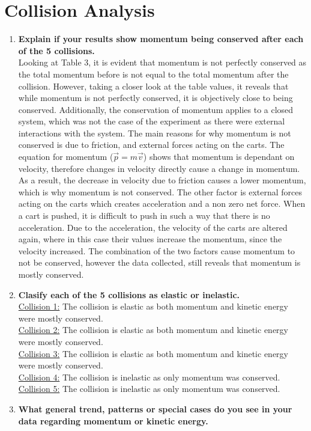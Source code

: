 \documentclass[12pt,letterpaper]{article}
\begin{document}
\section{Collision Analysis}
\begin{enumerate}
	\item \textbf{Explain if your results show momentum being conserved after each of the 5 collisions.}\\
	      Looking at Table 3, it is evident that momentum is not perfectly conserved as the total momentum before is not equal to the total momentum after the collision.
	      However, taking a closer look at the table values, it reveals that while momentum is not perfectly conserved, it is objectively close to being conserved.
	      Additionally, the conservation of momentum applies to a closed system, which was not the case of the experiment as there were external interactions with the system.
	      The main reasons for why momentum is not conserved is due to friction, and external forces acting on the carts.
	      The equation for momentum ($\vec{p} = m\vec{v}$) shows that momentum is dependant on velocity, therefore changes in velocity directly cause a change in momentum.
	      As a result, the decrease in velocity due to friction causes a lower momentum, which is why momentum is not conserved.
	      The other factor is external forces acting on the carts which creates acceleration and a non zero net force.
	      When a cart is pushed, it is difficult to push in such a way that there is no acceleration.
	      Due to the acceleration, the velocity of the carts are altered again, where in this case their values increase the momentum, since the velocity increased.
	      The combination of the two factors cause momentum to not be conserved, however the data collected, still reveals that momentum is mostly conserved.
	\item \textbf{Clasify each of the 5 collisions as elastic or inelastic.}\\
	      \underline{Collision 1:} The collision is elastic as both momentum and kinetic energy were mostly conserved.\\
	      \underline{Collision 2:} The collision is elastic as both momentum and kinetic energy were mostly conserved.\\
	      \underline{Collision 3:} The collision is elastic as both momentum and kinetic energy were mostly conserved.\\
	      \underline{Collision 4:} The collision is inelastic as only momentum was conserved.\\
	      \underline{Collision 5:} The collision is inelastic as only momentum was conserved.
	\item \textbf{What general trend, patterns or special cases do you see in your data regarding momentum or kinetic energy.}
\end{enumerate}
\end{document}
